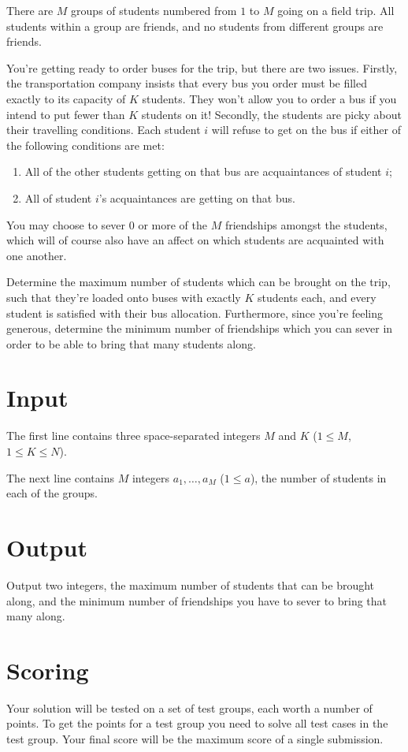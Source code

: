 There are $M$ groups of students numbered from $1$ to $M$ going on a field trip.
All students within a group are friends,  and no students from different groups are friends.

You're getting ready to order buses for the trip, but there are two issues.
Firstly, the transportation company insists that every bus you order must be filled exactly to its capacity of $K$ students.
They won't allow you to order a bus if you intend to put fewer than $K$ students on it!
Secondly, the students are picky about their travelling conditions.
Each student $i$ will refuse to get on the bus if either of the following conditions are met:
\begin{enumerate}
  \item All of the other students getting on that bus are acquaintances of student $i$;
  \item All of student $i$'s acquaintances are getting on that bus.
\end{enumerate}

You may choose to sever $0$ or more of the $M$ friendships amongst the students, which will of course also have an affect on which students are acquainted with one another.

Determine the maximum number of students which can be brought on the trip, such that they're loaded onto buses with exactly $K$ students each, and every student is satisfied with their bus allocation.
Furthermore, since you're feeling generous, determine the minimum number of friendships which you can sever in order to be able to bring that many students along.

\section*{Input}
The first line contains three space-separated integers $M$ and $K$ ($1 \le M$, $1 \le K \le N$).

The next line contains $M$ integers $a_1, \dots, a_M$ ($1 \le a$), the number of students in each of the groups.

\section*{Output}
Output two integers, the maximum number of students that can be brought along, and the minimum number of friendships you have to sever to bring that many along.

\section*{Scoring}
Your solution will be tested on a set of test groups, each worth a number of points.
To get the points for a test group you need to solve all test cases in the test group.
Your final score will be the maximum score of a single submission.

